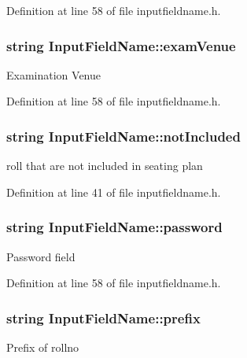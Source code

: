 Definition at line 58 of file inputfieldname.\-h.

\hypertarget{classInputFieldName_affaa2fe8246959748f43ea58f161b2b5}{
\subsubsection[{exam\-Venue}]{\setlength{\rightskip}{0pt plus 5cm}string Input\-Field\-Name\-::exam\-Venue}}\label{classInputFieldName_affaa2fe8246959748f43ea58f161b2b5}
Examination Venue 

Definition at line 58 of file inputfieldname.\-h.

\hypertarget{classInputFieldName_a9ee6ee84737e1199bdfd9fb24c82c2c7}{
\subsubsection[{not\-Included}]{\setlength{\rightskip}{0pt plus 5cm}string Input\-Field\-Name\-::not\-Included}}\label{classInputFieldName_a9ee6ee84737e1199bdfd9fb24c82c2c7}
roll that are not included in seating plan 

Definition at line 41 of file inputfieldname.\-h.

\hypertarget{classInputFieldName_a318f819ef4663d7e5f40d91180093cb9}{
\subsubsection[{password}]{\setlength{\rightskip}{0pt plus 5cm}string Input\-Field\-Name\-::password}}\label{classInputFieldName_a318f819ef4663d7e5f40d91180093cb9}
Password field 

Definition at line 58 of file inputfieldname.\-h.

\hypertarget{classInputFieldName_a161d155f8faca2c5dea1bbd607b17553}{
\subsubsection[{prefix}]{\setlength{\rightskip}{0pt plus 5cm}string Input\-Field\-Name\-::prefix}}\label{classInputFieldName_a161d155f8faca2c5dea1bbd607b17553}
Prefix of rollno 

